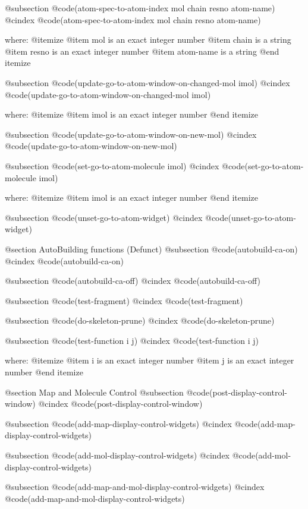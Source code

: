 @subsection @code{(atom-spec-to-atom-index mol chain resno atom-name)}
@cindex @code{(atom-spec-to-atom-index mol chain resno atom-name)}
 
where: 
 @itemize 
     @item mol is an exact integer number
     @item chain is a string
     @item resno is an exact integer number
     @item atom-name is a string
 @end itemize


@subsection @code{(update-go-to-atom-window-on-changed-mol imol)}
@cindex @code{(update-go-to-atom-window-on-changed-mol imol)}
 
where: 
 @itemize 
     @item imol is an exact integer number
 @end itemize


@subsection @code{(update-go-to-atom-window-on-new-mol)}
@cindex @code{(update-go-to-atom-window-on-new-mol)}
 
@subsection @code{(set-go-to-atom-molecule imol)}
@cindex @code{(set-go-to-atom-molecule imol)}
 
where: 
 @itemize 
     @item imol is an exact integer number
 @end itemize


@subsection @code{(unset-go-to-atom-widget)}
@cindex @code{(unset-go-to-atom-widget)}
 

@section AutoBuilding functions (Defunct) 
@subsection @code{(autobuild-ca-on)}
@cindex @code{(autobuild-ca-on)}
 
@subsection @code{(autobuild-ca-off)}
@cindex @code{(autobuild-ca-off)}
 
@subsection @code{(test-fragment)}
@cindex @code{(test-fragment)}
 
@subsection @code{(do-skeleton-prune)}
@cindex @code{(do-skeleton-prune)}
 
@subsection @code{(test-function i j)}
@cindex @code{(test-function i j)}
 
where: 
 @itemize 
     @item i is an exact integer number
     @item j is an exact integer number
 @end itemize



@section Map and Molecule Control 
@subsection @code{(post-display-control-window)}
@cindex @code{(post-display-control-window)}
 
@subsection @code{(add-map-display-control-widgets)}
@cindex @code{(add-map-display-control-widgets)}
 
@subsection @code{(add-mol-display-control-widgets)}
@cindex @code{(add-mol-display-control-widgets)}
 
@subsection @code{(add-map-and-mol-display-control-widgets)}
@cindex @code{(add-map-and-mol-display-control-widgets)}
 

